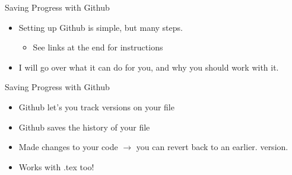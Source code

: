 \documentclass[ignorenonframetext,]{beamer}
\providecommand{\tightlist}{%
  \setlength{\itemsep}{0pt}\setlength{\parskip}{0pt}}
\begin{document}
\begin{frame}{Saving Progress with Github}
\protect\hypertarget{saving-progress-with-github-1}{}

\begin{itemize}
\tightlist
\item
  Setting up Github is simple, but many steps.

  \begin{itemize}
  \tightlist
  \item
    See links at the end for instructions
  \end{itemize}
\item
  I will go over what it can do for you, and why you should work with
  it.
\end{itemize}

\end{frame}

\begin{frame}{Saving Progress with Github}
\protect\hypertarget{saving-progress-with-github-2}{}

\begin{itemize}
\item
  Github let’s you track versions on your file
\item
  Github saves the history of your file
\item
  Made changes to your code \(\rightarrow\) you can
  \alert{revert back to an earlier}. version.
\item
  Works with .tex too!
\end{itemize}

\end{frame}
\end{document}
